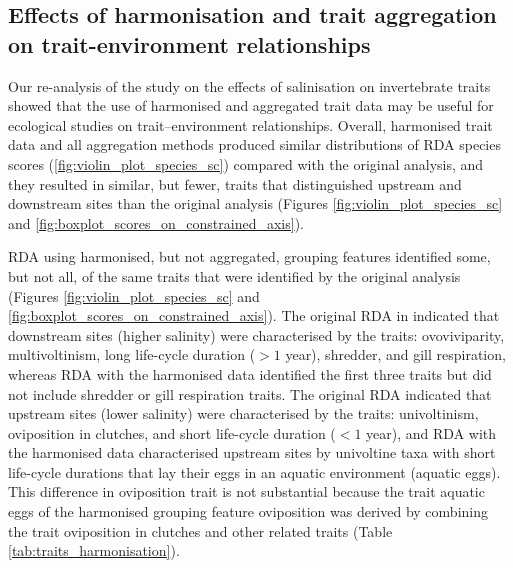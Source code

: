 \documentclass{article}
\begin{document}
\newpage


\subsection*{Effects of harmonisation and trait aggregation on trait-environment relationships}

Our re-analysis of the \citet{szocs_effects_2014} study on the effects of salinisation on invertebrate traits showed that the use of harmonised and aggregated trait data may be useful for ecological studies on trait–environment relationships. Overall, harmonised trait data and all aggregation methods produced similar distributions of RDA species scores (\ref{fig:violin_plot_species_sc}) compared with the original analysis, and they resulted in similar, but fewer, traits that distinguished upstream and downstream sites than the original analysis (Figures \ref{fig:violin_plot_species_sc} and \ref{fig:boxplot_scores_on_constrained_axis}).

RDA using harmonised, but not aggregated, grouping features identified some, but not all, of the same traits that were identified by the original analysis (Figures \ref{fig:violin_plot_species_sc} and \ref{fig:boxplot_scores_on_constrained_axis}). The original RDA in \citet{szocs_effects_2014} indicated that downstream sites (higher salinity) were characterised by the traits: ovoviviparity, multivoltinism, long life-cycle duration ($> 1$ year), shredder, and gill respiration, whereas RDA with the harmonised data identified the first three traits but did not include shredder or gill respiration traits. The original RDA indicated that upstream sites (lower salinity) were characterised by the traits: univoltinism, oviposition in clutches, and short life-cycle duration ($< 1$ year), and RDA with the harmonised data characterised upstream sites by univoltine taxa with short life-cycle durations that lay their eggs in an aquatic environment (aquatic eggs). This difference in oviposition trait is not substantial because the trait aquatic eggs of the harmonised grouping feature oviposition was derived by combining the trait oviposition in clutches and other related traits (Table \ref{tab:traits_harmonisation}).
\end{document}
